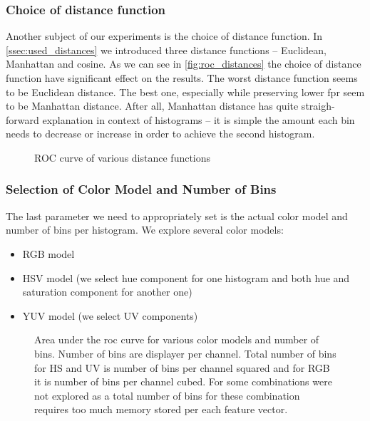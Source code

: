 \subsubsection{Choice of distance function}

Another subject of our experiments is the choice of distance function. In
\autoref{ssec:used_distances} we introduced three distance functions --
Euclidean, Manhattan and cosine. As we can see in \autoref{fig:roc_distances}
the choice of distance function have significant effect on the results.
The worst distance function seems to be Euclidean distance. The best one,
especially while preserving lower \gls{fpr} seem to be Manhattan distance.
After all, Manhattan distance has quite straigh-forward explanation in context
of histograms -- it is simple the amount each bin needs to decrease or increase
in order to achieve the second histogram.

\begin{figure}
    \centering
    \def\svgwidth{\columnwidth}
    
    \caption{ROC curve of various distance functions}
    \label{fig:roc_distances}
\end{figure}

\subsubsection{Selection of Color Model and Number of Bins}

The last parameter we need to appropriately set is the actual color model
and number of bins per histogram. We explore several color models:

\begin{itemize}
    \item RGB model
    \item HSV model (we select hue component for one histogram and both hue and saturation component for another one)
    \item YUV model (we select UV components)
\end{itemize}

\begin{figure}
    \centering
    \def\svgwidth{\columnwidth}
    \Large
    \scalebox{0.7}{}
    \caption[Area under the ROC curve for various color models and number of bins]{Area under the \gls{roc} curve for various color models and number of bins. Number of bins are displayer per channel. Total number of bins for HS and UV is number of bins per channel squared and for RGB it is number of bins per channel cubed. For some combinations were not explored as a total number of bins for these combination requires too much memory stored per each feature vector.}
    \label{fig:model_bins}
\end{figure}

